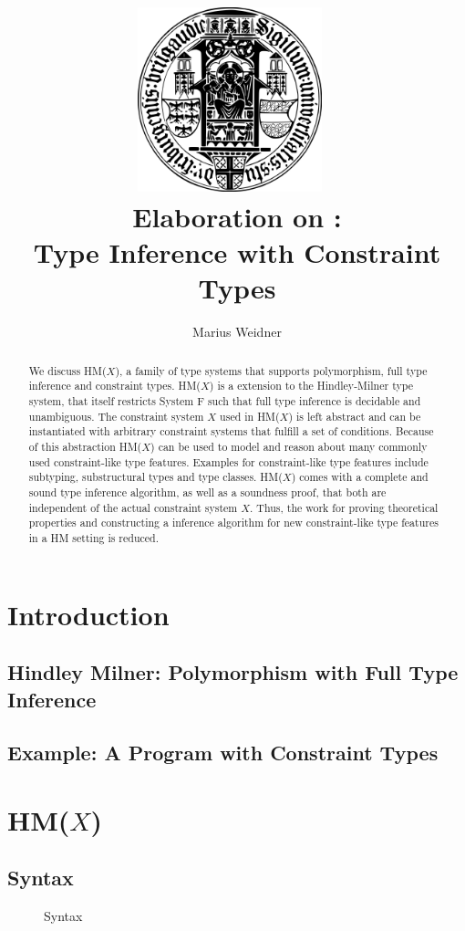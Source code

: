 \documentclass[runningheads]{llncs}
\title{\includegraphics[width=0.4\textwidth]{logo.png}~\\[1cm] Elaboration on \hmx:\\Type Inference with Constraint Types}
\institute{Chair of Programming Languages, University of Freiburg \\ \email{weidner@cs.uni-freiburg.de}}
\author{Marius Weidner}
\newcommand{\hmx}{HM($X$)}
\begin{document}
\let\oldaddcontentsline\addcontentsline{}
\def\addcontentsline#1#2#3{}
\maketitle
\def\addcontentsline#1#2#3{\oldaddcontentsline{#1}{#2}{#3}}

\begin{abstract}
  We discuss \hmx{}, a family of type systems that supports polymorphism, full type inference and constraint types. 
  \hmx{} is a extension to the Hindley-Milner type system, that itself restricts System F such that full type inference is decidable and unambiguous.
  The constraint system $X$ used in \hmx{} is left abstract and can be instantiated with arbitrary constraint systems that fulfill a set of conditions. 
  Because of this abstraction \hmx{} can be used to model and reason about many commonly used constraint-like type features. 
  Examples for constraint-like type features include subtyping, substructural types and type classes. 
  \hmx{} comes with a complete and sound type inference algorithm, as well as a soundness proof, that both are independent of the actual constraint system $X$.
  Thus, the work for proving theoretical properties and constructing a inference algorithm for new constraint-like type features in a HM setting is reduced. 
\end{abstract}

\setcounter{tocdepth}{2}
\tableofcontents
\newpage 

\section{Introduction}
\subsection{Hindley Milner: Polymorphism with Full Type Inference}
\subsection{Example: A Program with Constraint Types}
\section{\hmx{}}
\subsection{Syntax}
\begin{figure}[t]
  \centering
  \caption{Syntax}
\end{figure}
\end{document}
